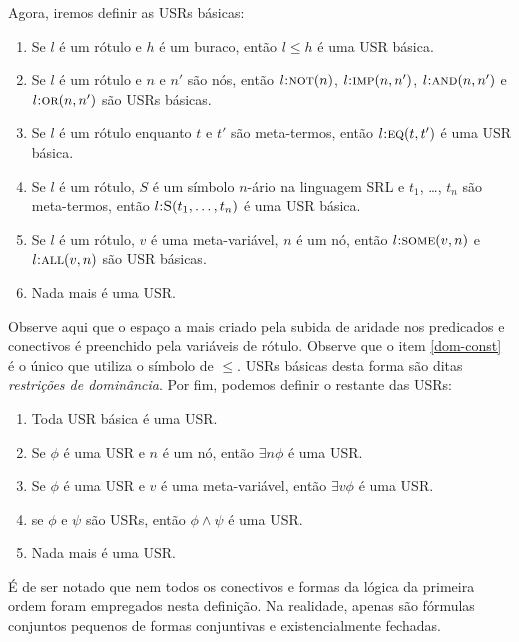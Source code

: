 Agora, iremos definir as USRs básicas:
\begin{enumerate}
\item Se $l$ é um rótulo e $h$ é um buraco, então $l \leq h$ é uma USR básica. \label{dom-const}
\item Se $l$ é um rótulo e $n$ e $n'$ são nós, então $l\textsc{:not}(n)$, $l\textsc{:imp}(n,n')$, $l\textsc{:and}(n,n')$ e $l\textsc{:or}(n,n')$ são USRs básicas.
\item Se $l$ é um rótulo enquanto $t$ e $t'$ são meta-termos, então $l\textsc{:eq}(t,t')$ é uma USR básica.
\item Se $l$ é um rótulo, $S$ é um símbolo $n$-ário na linguagem SRL e $t_1$, \dots, $t_n$ são meta-termos, então $l\textsc{:S}(t_1,\dots, t_n)$ é uma USR básica.
\item Se $l$ é um rótulo, $v$ é uma meta-variável, $n$ é um nó,	então $l\textsc{:some}(v,n)$ e $l\textsc{:all}(v,n)$ são USR básicas.
\item Nada mais é uma USR.
\end{enumerate}

Observe aqui que o espaço a mais criado pela subida de aridade nos predicados e conectivos é preenchido pela variáveis de rótulo. Observe que o item \ref{dom-const} é o único que utiliza o símbolo de $\leq$. USRs básicas desta forma são ditas \textit{restrições de dominância}. Por fim, podemos definir o restante das USRs:

\begin{enumerate}
\item Toda USR básica é uma USR.
\item Se $\phi$ é uma USR e $n$ é um nó, então $\exists n \phi$ é uma USR.
\item Se $\phi$ é uma USR e $v$ é uma meta-variável, então $\exists v \phi$ é uma USR.
\item se $\phi$ e $\psi$ são USRs, então $\phi \land \psi$ é uma USR.
\item Nada mais é uma USR.
\end{enumerate}

É de ser notado que nem todos os conectivos e formas da lógica da primeira ordem foram empregados nesta definição. Na realidade, apenas são fórmulas conjuntos pequenos de formas conjuntivas e existencialmente fechadas. \cite[p.~131]{BlackburnBos:2005}